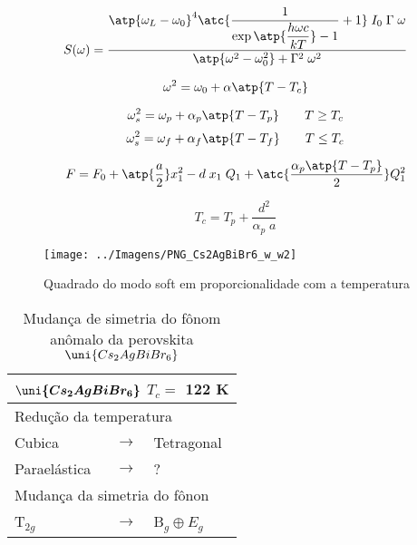 \begin{equation}
	S(\omega) = \frac{\atp{\omega_L - \omega_0}^4 \atc{\displaystyle \frac{1}{\displaystyle \exp{\atp{\frac{h \omega c}{k T}}} - 1} + 1} \; I_0 \; \Gamma \; \omega}{\atp{\omega^2 - \omega_0^2} + \Gamma^2 \; \omega^2}
\end{equation}

\begin{equation}
	\omega^2 = \omega_0 + \alpha \atp{T - T_c}
\end{equation}

\begin{equation}
	\omega_s^2 = \omega_p + \alpha_p \atp{T - T_p} \qquad T \geq T_c
\end{equation}
\begin{equation}
	\omega_s^2 = \omega_f + \alpha_f \atp{T - T_f} \qquad T \leq T_c
\end{equation}

\begin{equation}
	F = F_0 + \atp{\frac{a}{2}} x_1^2 - d \; x_1 \; Q_1 + \atc{\frac{\alpha_p\atp{T - T_p}}{2}} Q_1^2
\end{equation}

\begin{equation}
	T_c = T_p + \frac{d^2}{\alpha_p \; a} %
	\label{condicao}
\end{equation}

\begin{figure}[h!]
    \centering
    \texttt{[image: ../Imagens/PNG\_Cs2AgBiBr6\_w\_w2]}
    \caption{Quadrado do modo soft em proporcionalidade com a temperatura}
    \label{raman_w_w2}
\end{figure}

\begin{table}[h!] \centering
	\begin{tabular}{lcl} \hline
		\multicolumn{3}{l}{$\boldsymbol{\uni{Cs_2 Ag Bi Br_6}}$ \quad $T_c =$ 122 K} \\ \hline
		\multicolumn{3}{l}{Redução da temperatura} \\ \hline
		Cubica & $\rightarrow$ & Tetragonal \\ 
		Paraelástica & $\rightarrow$ & ? \\ \hline
		\multicolumn{3}{l}{Mudança da simetria do fônon} \\ \hline
		T$_{2g}$ & $\rightarrow$ & B$_{g} \oplus E_{g}$ \\ \hline
	\end{tabular}
	\caption{Mudança de simetria do fônom anômalo da perovskita $\uni{Cs_2 Ag Bi Br_6}$}
	\label{comp_w_w2}
\end{table}

